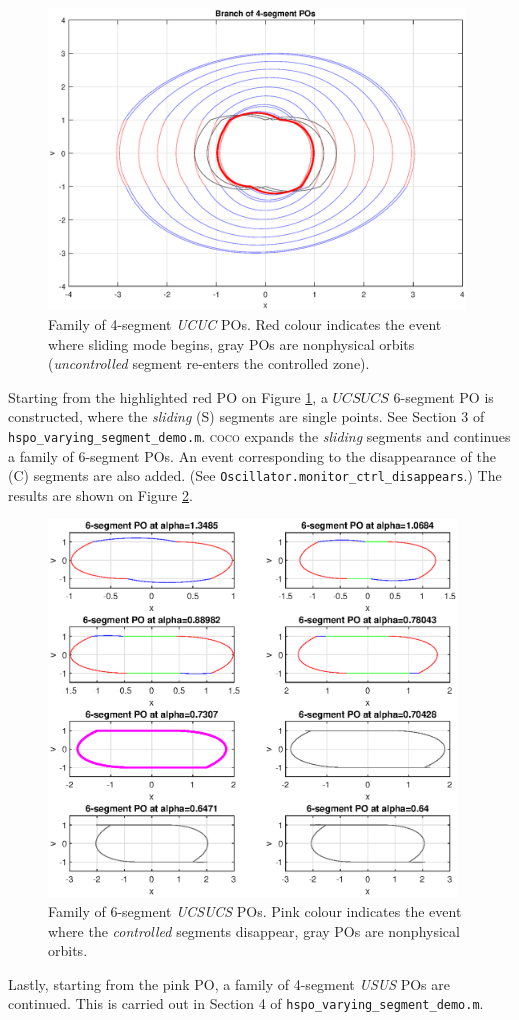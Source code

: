 \documentclass{article}
\begin{document}
\begin{figure}[h!]
	\centering 
	\includegraphics[height=8cm]{fig2}
	\caption{Family of 4-segment \emph{UCUC} POs. Red colour indicates the event where sliding mode begins, gray POs are nonphysical orbits (\emph{uncontrolled} segment re-enters the controlled zone).\label{fig:2}}
\end{figure}

Starting from the highlighted red PO on Figure \ref{fig:2}, a $UCSUCS$ 6-segment PO is constructed, where the \emph{sliding} (S) segments are single points. See Section 3 of \texttt{hspo\_varying\_segment\_demo.m}. \textsc{coco} expands the \emph{sliding} segments and continues a family of 6-segment POs. An event corresponding to the disappearance of the (C) segments are also added. (See \texttt{Oscillator.monitor\_ctrl\_disappears}.) The results are shown on Figure \ref{fig:3}.

\begin{figure}[h!]
	\centering 
	\includegraphics[height=10cm]{fig3}
	\caption{Family of 6-segment \emph{UCSUCS} POs. Pink colour indicates the event where the \emph{controlled} segments disappear, gray POs are nonphysical orbits.\label{fig:3}}
\end{figure}
\newpage 
Lastly, starting from the pink PO, a family of 4-segment \emph{USUS} POs are continued. This is carried out in Section 4 of \texttt{hspo\_varying\_segment\_demo.m}.
\end{document}
